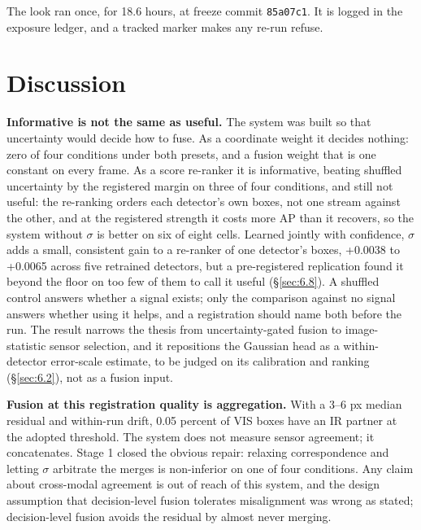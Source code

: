 \documentclass[10pt]{article}
\begin{document}
The look ran once, for 18.6 hours, at freeze commit \texttt{85a07c1}. It is logged in the exposure ledger, and a tracked marker makes any re-run refuse.

\section{Discussion}\label{sec:8}
\textbf{Informative is not the same as useful.} The system was built so that uncertainty would decide how to fuse. As a coordinate weight it decides nothing: zero of four conditions under both presets, and a fusion weight that is one constant on every frame. As a score re-ranker it is informative, beating shuffled uncertainty by the registered margin on three of four conditions, and still not useful: the re-ranking orders each detector's own boxes, not one stream against the other, and at the registered strength it costs more AP than it recovers, so the system without $\sigma$ is better on six of eight cells. Learned jointly with confidence, $\sigma$ adds a small, consistent gain to a re-ranker of one detector's boxes, +0.0038 to +0.0065 across five retrained detectors, but a pre-registered replication found it beyond the floor on too few of them to call it useful (\S\ref{sec:6.8}). A shuffled control answers whether a signal exists; only the comparison against no signal answers whether using it helps, and a registration should name both before the run. The result narrows the thesis from uncertainty-gated fusion to image-statistic sensor selection, and it repositions the Gaussian head as a within-detector error-scale estimate, to be judged on its calibration and ranking (\S\ref{sec:6.2}), not as a fusion input.

\textbf{Fusion at this registration quality is aggregation.} With a 3--6 px median residual and within-run drift, 0.05 percent of VIS boxes have an IR partner at the adopted threshold. The system does not measure sensor agreement; it concatenates. Stage 1 closed the obvious repair: relaxing correspondence and letting $\sigma$ arbitrate the merges is non-inferior on one of four conditions. Any claim about cross-modal agreement is out of reach of this system, and the design assumption that decision-level fusion tolerates misalignment was wrong as stated; decision-level fusion avoids the residual by almost never merging.
\end{document}
